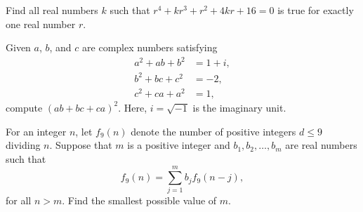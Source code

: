 \documentclass[11pt]{article}
\theoremstyle{definition}
\begin{document}
%	




\begin{question}[name={2014 HMMT, Algebra, \href{https://artofproblemsolving.com/community/c129h596747p3541017}{Problem 8}}]
	Find all real numbers $k$ such that $r^4+kr^3+r^2+4kr+16=0$ is true for exactly one real number $r$.	
\end{question}




%	









\begin{question}[name={2014 HMMT, Algebra, \href{}{Problem }}]
	Given $a$, $b$, and $c$ are complex numbers satisfying
	\begin{align*}
		a^2+ab+b^2 &= 1+i,\\
		b^2+bc+c^2 &= -2,\\
		c^2+ca+a^2 &= 1,
	\end{align*}
	compute $(ab+bc+ca)^2$. Here, $i=\sqrt{-1}$ is the imaginary unit.
\end{question}




%	







\begin{question}[name={2014 HMMT, Algebra, \href{https://artofproblemsolving.com/community/c129h596748p3541020}{Problem 10}}]
	For an integer $n$, let $f_9(n)$ denote the number of positive integers $d\leq 9$ dividing $n$. Suppose that $m$ is a positive integer and $b_1,b_2,\ldots,b_m$ are real numbers such that $$f_9(n)=\textstyle\sum_{j=1}^mb_jf_9(n-j),$$ for all $n>m$. Find the smallest possible value of $m$.
\end{question}
\end{document}
